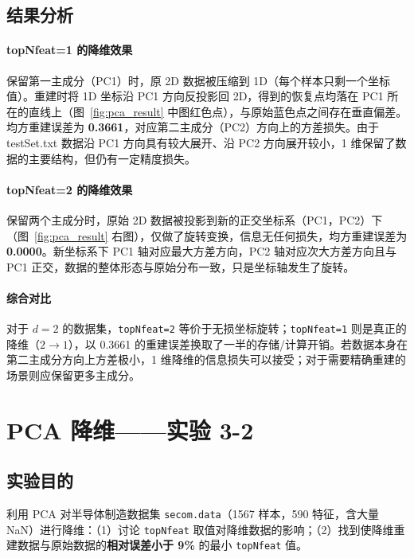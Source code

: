 \documentclass[10.5pt]{config}
\begin{document}
\subsection{结果分析}

\paragraph{topNfeat=1 的降维效果}
保留第一主成分（PC1）时，原 2D 数据被压缩到 1D（每个样本只剩一个坐标值）。重建时将 1D 坐标沿 PC1 方向反投影回 2D，得到的恢复点均落在 PC1 所在的直线上（图~\ref{fig:pca_result} 中图红色点），与原始蓝色点之间存在垂直偏差。均方重建误差为 \textbf{0.3661}，对应第二主成分（PC2）方向上的方差损失。由于 testSet.txt 数据沿 PC1 方向具有较大展开、沿 PC2 方向展开较小，1 维保留了数据的主要结构，但仍有一定精度损失。

\paragraph{topNfeat=2 的降维效果}
保留两个主成分时，原始 2D 数据被投影到新的正交坐标系（PC1，PC2）下（图~\ref{fig:pca_result} 右图），仅做了旋转变换，信息无任何损失，均方重建误差为 \textbf{0.0000}。新坐标系下 PC1 轴对应最大方差方向，PC2 轴对应次大方差方向且与 PC1 正交，数据的整体形态与原始分布一致，只是坐标轴发生了旋转。

\paragraph{综合对比}
对于 $d=2$ 的数据集，\texttt{topNfeat=2} 等价于无损坐标旋转；\texttt{topNfeat=1} 则是真正的降维（$2\to1$），以 0.3661 的重建误差换取了一半的存储/计算开销。若数据本身在第二主成分方向上方差极小，1 维降维的信息损失可以接受；对于需要精确重建的场景则应保留更多主成分。

\clearpage
\section{PCA 降维——实验 3-2}

\subsection{实验目的}
利用 PCA 对半导体制造数据集 \texttt{secom.data}（1567 样本，590 特征，含大量 NaN）进行降维：（1）讨论 \texttt{topNfeat} 取值对降维数据的影响；（2）找到使降维重建数据与原始数据的\textbf{相对误差小于 9\%} 的最小 \texttt{topNfeat} 值。
\end{document}
